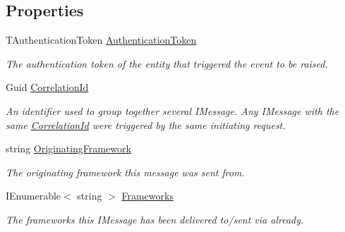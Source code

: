 \subsection*{Properties}
\begin{DoxyCompactItemize}
\item 
T\+Authentication\+Token \hyperlink{classCqrs_1_1WebApi_1_1HelpPageConfig_1_1UserCreatedEvent_a02e51969b7b6c8af4790757dc26cc480_a02e51969b7b6c8af4790757dc26cc480}{Authentication\+Token}
\begin{DoxyCompactList}\small\item\em The authentication token of the entity that triggered the event to be raised. \end{DoxyCompactList}\item 
Guid \hyperlink{classCqrs_1_1WebApi_1_1HelpPageConfig_1_1UserCreatedEvent_aa62add44755ea01cd6b98a7d5e7a9bd0_aa62add44755ea01cd6b98a7d5e7a9bd0}{Correlation\+Id}
\begin{DoxyCompactList}\small\item\em An identifier used to group together several I\+Message. Any I\+Message with the same \hyperlink{classCqrs_1_1WebApi_1_1HelpPageConfig_1_1UserCreatedEvent_aa62add44755ea01cd6b98a7d5e7a9bd0_aa62add44755ea01cd6b98a7d5e7a9bd0}{Correlation\+Id} were triggered by the same initiating request. \end{DoxyCompactList}\item 
string \hyperlink{classCqrs_1_1WebApi_1_1HelpPageConfig_1_1UserCreatedEvent_a5d4fbf202d00e1a969a763e64b69084d_a5d4fbf202d00e1a969a763e64b69084d}{Originating\+Framework}
\begin{DoxyCompactList}\small\item\em The originating framework this message was sent from. \end{DoxyCompactList}\item 
I\+Enumerable$<$ string $>$ \hyperlink{classCqrs_1_1WebApi_1_1HelpPageConfig_1_1UserCreatedEvent_aaccd19bfc417660ef3560b5f2742b5a1_aaccd19bfc417660ef3560b5f2742b5a1}{Frameworks}
\begin{DoxyCompactList}\small\item\em The frameworks this I\+Message has been delivered to/sent via already. \end{DoxyCompactList}\item 

\end{DoxyCompactItemize}
